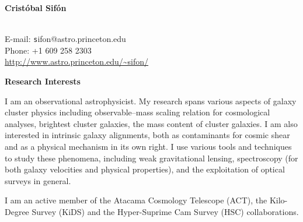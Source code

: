 \documentclass[11pt]{article}
\begin{document}
\begin{minipage}[b]{0.46\linewidth}
\flushleft
\hspace{-0.7cm}
{\bf\huge Crist\'obal Sif\'on}\\\vspace{0.2cm}
\\
\end{minipage}
\begin{minipage}[b]{0.49\linewidth}
\flushright
{\large E-mail: {\texttt sifon@astro.princeton.edu}\\
        Phone: +1 609 258 2303\\
        \url{http://www.astro.princeton.edu/~sifon/}}
\end{minipage}
\vspace{0.4cm}
\hline

\vspace{0.5cm}
\noindent
{\bf\Large Research Interests}\\
% 

{\large
I am an observational astrophysicist.
My research spans various aspects of galaxy cluster physics including observable--mass scaling relation for cosmological analyses, brightest cluster galaxies, the mass content of cluster galaxies. I am also interested in intrinsic galaxy alignments, both as contaminants for cosmic shear and as a physical mechanism in its own right. I use various tools and techniques to study these phenomena, including weak gravitational lensing, spectroscopy (for both galaxy velocities and physical properties), and the exploitation of optical surveys in general.

I am an active member of the Atacama Cosmology Telescope (ACT), the Kilo-Degree Survey (KiDS) and the Hyper-Suprime Cam Survey (HSC) collaborations.
}
\end{document}
